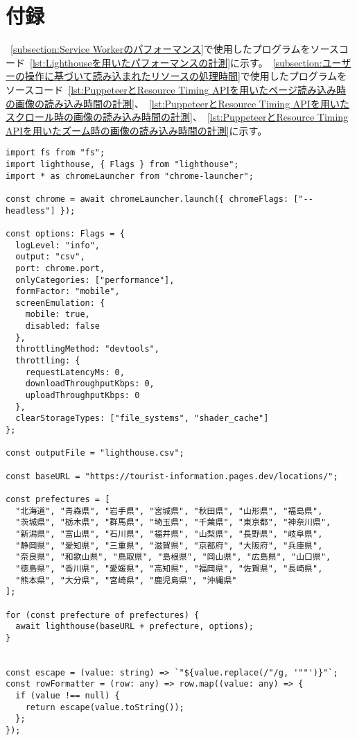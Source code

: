 \section*{付録}
~\autoref{subsection:Service Workerのパフォーマンス}で使用したプログラムをソースコード~\ref{lst:Lighthouseを用いたパフォーマンスの計測}に示す。~\autoref{subsection:ユーザーの操作に基づいて読み込まれたリソースの処理時間}で使用したプログラムをソースコード~\ref{lst:PuppeteerとResource Timing APIを用いたページ読み込み時の画像の読み込み時間の計測}、~\ref{lst:PuppeteerとResource Timing APIを用いたスクロール時の画像の読み込み時間の計測}、~\ref{lst:PuppeteerとResource Timing APIを用いたズーム時の画像の読み込み時間の計測}に示す。

\begin{lstlisting}[caption={Lighthouseを用いたパフォーマンスの計測},label={lst:Lighthouseを用いたパフォーマンスの計測}]
import fs from "fs";
import lighthouse, { Flags } from "lighthouse";
import * as chromeLauncher from "chrome-launcher";

const chrome = await chromeLauncher.launch({ chromeFlags: ["--headless"] });

const options: Flags = {
  logLevel: "info",
  output: "csv",
  port: chrome.port,
  onlyCategories: ["performance"],
  formFactor: "mobile",
  screenEmulation: {
    mobile: true,
    disabled: false
  },
  throttlingMethod: "devtools",
  throttling: {
    requestLatencyMs: 0,
    downloadThroughputKbps: 0,
    uploadThroughputKbps: 0
  },
  clearStorageTypes: ["file_systems", "shader_cache"]
};

const outputFile = "lighthouse.csv";

const baseURL = "https://tourist-information.pages.dev/locations/";

const prefectures = [
  "北海道", "青森県", "岩手県", "宮城県", "秋田県", "山形県", "福島県",
  "茨城県", "栃木県", "群馬県", "埼玉県", "千葉県", "東京都", "神奈川県",
  "新潟県", "富山県", "石川県", "福井県", "山梨県", "長野県", "岐阜県",
  "静岡県", "愛知県", "三重県", "滋賀県", "京都府", "大阪府", "兵庫県",
  "奈良県", "和歌山県", "鳥取県", "島根県", "岡山県", "広島県", "山口県",
  "徳島県", "香川県", "愛媛県", "高知県", "福岡県", "佐賀県", "長崎県",
  "熊本県", "大分県", "宮崎県", "鹿児島県", "沖縄県"
];

for (const prefecture of prefectures) {
  await lighthouse(baseURL + prefecture, options);
}


const escape = (value: string) => `"${value.replace(/"/g, '""')}"`;
const rowFormatter = (row: any) => row.map((value: any) => {
  if (value !== null) {
    return escape(value.toString());
  };
});


\end{lstlisting}
